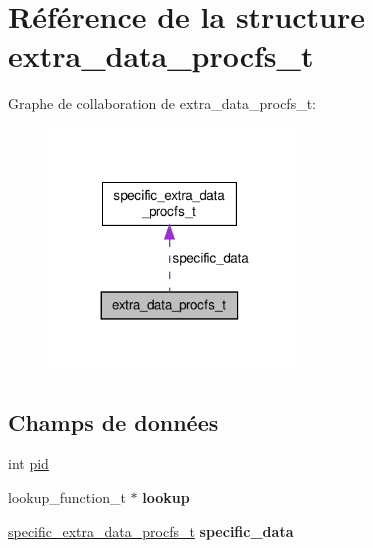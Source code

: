 \hypertarget{structextra__data__procfs__t}{\section{Référence de la structure extra\-\_\-data\-\_\-procfs\-\_\-t}
\label{structextra__data__procfs__t}
}


Graphe de collaboration de extra\-\_\-data\-\_\-procfs\-\_\-t\-:\nopagebreak
\begin{figure}[H]
\begin{center}
\leavevmode
\includegraphics[width=191pt]{structextra__data__procfs__t__coll__graph}
\end{center}
\end{figure}
\subsection*{Champs de données}
\begin{DoxyCompactItemize}
\item 
int \hyperlink{structextra__data__procfs__t_ad501deb466cabf589b4617eac9bcce30}{pid}
\item 
\hypertarget{structextra__data__procfs__t_ae8a1311a89d7e8a5ff387e86ee8a3572}{lookup\-\_\-function\-\_\-t $\ast$ {\bfseries lookup}}\label{structextra__data__procfs__t_ae8a1311a89d7e8a5ff387e86ee8a3572}

\item 
\hypertarget{structextra__data__procfs__t_afc77f89e2b31bb14ffa0fb90254df43d}{\hyperlink{unionspecific__extra__data__procfs__t}{specific\-\_\-extra\-\_\-data\-\_\-procfs\-\_\-t} {\bfseries specific\-\_\-data}}\label{structextra__data__procfs__t_afc77f89e2b31bb14ffa0fb90254df43d}

\end{DoxyCompactItemize}


